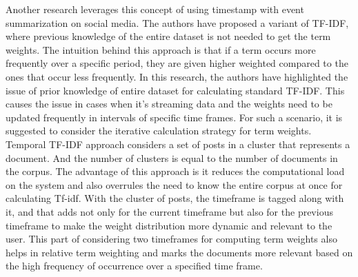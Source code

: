	
	Another research \cite{7817104} leverages this concept of using timestamp with event summarization on social media. The authors have proposed a variant of TF-IDF, where previous knowledge of the entire dataset is not needed to get the term weights. The intuition behind this approach is that if a term occurs more frequently over a specific period, they are given higher weighted compared to the ones that occur less frequently. In this research, the authors have highlighted the issue of prior knowledge of entire dataset for calculating standard TF-IDF. This causes the issue in cases when it's streaming data and the weights need to be updated frequently in intervals of specific time frames. For such a scenario, it is suggested to consider the iterative calculation strategy for term weights. Temporal TF-IDF approach considers a set of posts in a cluster that represents a document. And the number of clusters is equal to the number of documents in the corpus. The advantage of this approach is it reduces the computational load on the system and also overrules the need to know the entire corpus at once for calculating Tf-idf. With the cluster of posts, the timeframe is tagged along with it, and that adds not only for the current timeframe but also for the previous timeframe to make the weight distribution more dynamic and relevant to the user. This part of considering two timeframes for computing term weights also helps in relative term weighting and marks the documents more relevant based on the high frequency of occurrence over a specified time frame.
	
